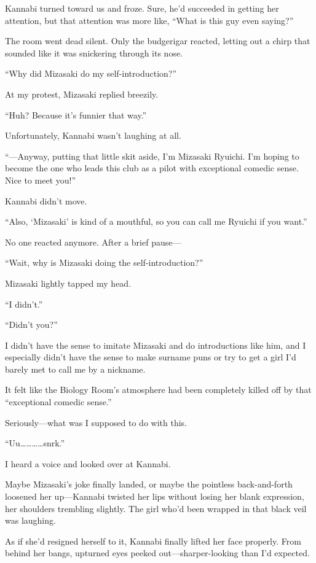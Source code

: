 \documentclass[
    a4paper,
    12pt,
    twoside,
    openany,
    UTF8,
    fontset=windows
]{ctexbook}
\begin{document}
Kannabi turned toward us and froze. Sure, he'd succeeded in getting her attention, but that attention was more like, ``What is this guy even saying?''

The room went dead silent. Only the budgerigar reacted, letting out a chirp that sounded like it was snickering through its nose.

``Why did Mizasaki do my self-introduction?''

At my protest, Mizasaki replied breezily.

``Huh? Because it's funnier that way.''

Unfortunately, Kannabi wasn't laughing at all.

``---Anyway, putting that little skit aside, I'm Mizasaki Ryuichi. I'm hoping to become the one who leads this club as a pilot with exceptional comedic sense. Nice to meet you!''

Kannabi didn't move.

``Also, `Mizasaki' is kind of a mouthful, so you can call me Ryuichi if you want.''

No one reacted anymore. After a brief pause---

``Wait, why is Mizasaki doing the self-introduction?''

Mizasaki lightly tapped my head.

``I didn't.''

``Didn't you?''

I didn't have the sense to imitate Mizasaki and do introductions like him, and I especially didn't have the sense to make surname puns or try to get a girl I'd barely met to call me by a nickname.

It felt like the Biology Room's atmosphere had been completely killed off by that ``exceptional comedic sense.''

Seriously---what was I supposed to do with this.

``Uu\dots\dots\dots\dots snrk.''

I heard a voice and looked over at Kannabi.

Maybe Mizasaki's joke finally landed, or maybe the pointless back-and-forth loosened her up---Kannabi twisted her lips without losing her blank expression, her shoulders trembling slightly. The girl who'd been wrapped in that black veil was laughing.

As if she'd resigned herself to it, Kannabi finally lifted her face properly. From behind her bangs, upturned eyes peeked out---sharper-looking than I'd expected.
\end{document}
